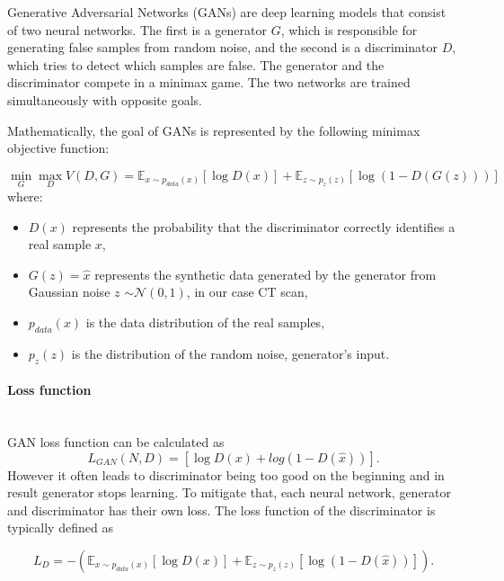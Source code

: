 Generative Adversarial Networks (GANs) are deep learning models that consist of two neural networks.
The first is a generator \( G \), which is responsible for generating false samples from random noise, and the second is a discriminator \( D \), which tries to detect which samples are false.
The generator and the discriminator compete in a minimax game. The two networks are trained simultaneously with opposite goals.

Mathematically, the goal of GANs is represented by the following minimax objective function:

\begin{equation}
\min_G \max_D V(D, G) = \mathbb{E}_{x \sim p_{data}(x)}[\log D(x)] + \mathbb{E}_{z \sim p_z(z)}[\log (1 - D(G(z)))]
\end{equation}
where:

\begin{itemize}
\item \( D(x) \) represents the probability that the discriminator correctly identifies a real sample \( x \),

\item \( G(z)=\hat{x} \) represents the synthetic data generated by the generator from Gaussian noise \( z \) $\sim\mathcal{N}(0,1)$, in our case CT scan,

\item \( p_{data}(x) \) is the data distribution of the real samples,

\item \( p_z(z) \) is the distribution of the random noise, generator's input.
\end{itemize}

\paragraph{Loss function}\mbox{}\\
\indent GAN loss function can be calculated as
\begin{equation}
    L_{GAN}(N,D) = [\log D(x) + log(1-D(\hat{x}))].
\label{loss_gan}
\end{equation}
However it often leads to discriminator being too good on the beginning and in result generator stops learning. To mitigate that, each neural network, generator and discriminator has their own loss.
The loss function of the discriminator is typically defined as

\begin{equation}
L_D = - \left( \mathbb{E}_{x \sim p_{data}(x)}[\log D(x)] + \mathbb{E}_{z \sim p_z(z)}[\log (1 - D(\hat{x}))] \right).
\end{equation}


